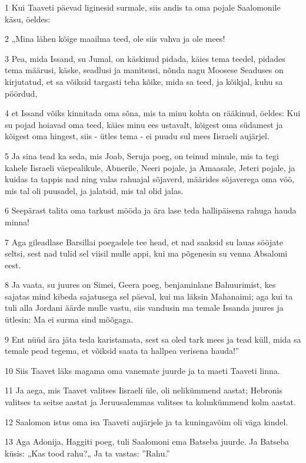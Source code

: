 \par 1 Kui Taaveti päevad liginesid surmale, siis andis ta oma pojale Saalomonile käsu, öeldes:
\par 2 „Mina lähen kõige maailma teed, ole siis vahva ja ole mees!
\par 3 Pea, mida Issand, su Jumal, on käskinud pidada, käies tema teedel, pidades tema määrusi, käske, seadlusi ja manitsusi, nõnda nagu Moosese Seaduses on kirjutatud, et sa võiksid targasti teha kõike, mida sa teed, ja kõikjal, kuhu sa pöördud,
\par 4 et Issand võiks kinnitada oma sõna, mis ta minu kohta on rääkinud, öeldes: Kui su pojad hoiavad oma teed, käies minu ees ustavalt, kõigest oma südamest ja kõigest oma hingest, siis - ütles tema - ei puudu sul mees Iisraeli aujärjel.
\par 5 Ja sina tead ka seda, mis Joab, Seruja poeg, on teinud minule, mis ta tegi kahele Iisraeli väepealikule, Abnerile, Neeri pojale, ja Amaasale, Jeteri pojale, ja kuidas ta tappis nad ning valas rahuajal sõjaverd, määrides sõjaverega oma vöö, mis tal oli puusadel, ja jalatsid, mis tal olid jalas.
\par 6 Seepärast talita oma tarkust mööda ja ära lase teda hallipäisena rahuga hauda minna!
\par 7 Aga gileadlase Barsillai poegadele tee head, et nad saaksid su lauas sööjate seltsi, sest nad tulid sel viisil mulle appi, kui ma põgenesin su venna Absalomi eest.
\par 8 Ja vaata, su juures on Simei, Geera poeg, benjaminlane Bahuurimist, kes sajatas mind kibeda sajatusega sel päeval, kui ma läksin Mahanaimi; aga kui ta tuli alla Jordani äärde mulle vastu, siis vandusin ma temale Issanda juures ja ütlesin: Ma ei surma sind mõõgaga.
\par 9 Ent nüüd ära jäta teda karistamata, sest sa oled tark mees ja tead küll, mida sa temale pead tegema, et võiksid saata ta hallpea verisena hauda!”
\par 10 Siis Taavet läks magama oma vanemate juurde ja ta maeti Taaveti linna.
\par 11 Ja aega, mis Taavet valitses Iisraeli üle, oli nelikümmend aastat; Hebronis valitses ta seitse aastat ja Jeruusalemmas valitses ta kolmkümmend kolm aastat.
\par 12 Saalomon istus oma isa Taaveti aujärjele ja ta kuningavõim oli väga kindel.
\par 13 Aga Adonija, Haggiti poeg, tuli Saalomoni ema Batseba juurde. Ja Batseba küsis: „Kas tood rahu?„ Ja ta vastas: ”Rahu.”
